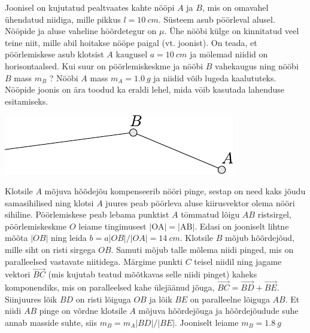 
Joonisel on kujutatud pealtvaates kahte nööpi $A$ ja $B$, mis on omavahel ühendatud niidiga, mille pikkus $l=\SI{10}{cm}$. Süsteem asub pöörleval alusel. Nööpide ja aluse vaheline hōõrdetegur on $\mu$. Ühe nööbi külge on kinnitatud veel teine niit, mille abil hoitakse nööpe paigal (vt. joonist). On teada, et pöörlemiskese asub klotsist $A$ kaugusel $a=\SI{10}{cm}$ ja mōlemad niidid on horisontaalsed. Kui suur on pöörlemiskeskme ja nööbi $B$ vahekaugus ning nööbi $B$ mass $m_{B}$ ? Nööbi $A$ mass $m_{A}=\SI{1,0}{g}$ ja niidid võib lugeda kaalututeks. Nööpide joonis on ära toodud ka eraldi lehel, mida vōib kasutada lahenduse esitamiseks.
\begin{center}
	\includegraphics[width=0.8\linewidth]{2004-v3g-08-yl.pdf}
\end{center}

\hint

\solu
Klotsile $A$ mõjuva hõõdejõu kompenseerib nööri pinge, sestap on need kaks jõudu samasihilised ning klotsi $A$ juures peab pöörleva aluse kiirusvektor olema nööri sihiline. Pöörlemiskese peab lebama punktist $A$ tōmmatud lõigu $A B$ ristsirgel, pöörlemiskeskme $O$ leiame tingimusest $|\mathrm{OA}|=|\mathrm{AB}|$. Edasi on jooniselt lihtne mõõta $|OB|$ ning leida $b=a|O B| /|O A|=\SI{14}{cm}$. Klotsile $B$ mõjub hõõrdejõud, mille siht on risti sirgega $O B$. Samuti mõjub talle mõlema niidi pinged, mis on paralleelsed vastavate niitidega. Märgime punkti $C$ teisel niidil ning jagame vektori $\overrightarrow{B C}$ (mis kujutab teatud mõõtkavas selle niidi pinget) kaheks komponendiks, mis on paralleelsed kahe ülejäänud jõuga, $\overrightarrow{B C}=\overrightarrow{B D}+\overrightarrow{B E}$. Siinjuures lõik $B D$ on risti lõiguga $O B$ ja lõik $B E$ on paralleelne lõiguga $A B$. Et niidi $A B$ pinge on võrdne klotsile $A$ mõjuva hõõrdejõuga ja hõõrdejõudude suhe annab masside suhte, siis $m_{B}=m_{A}|B D| /|B E| .$ Jooniselt leiame $m_{B}=\SI{1,8}{g}$

\probend